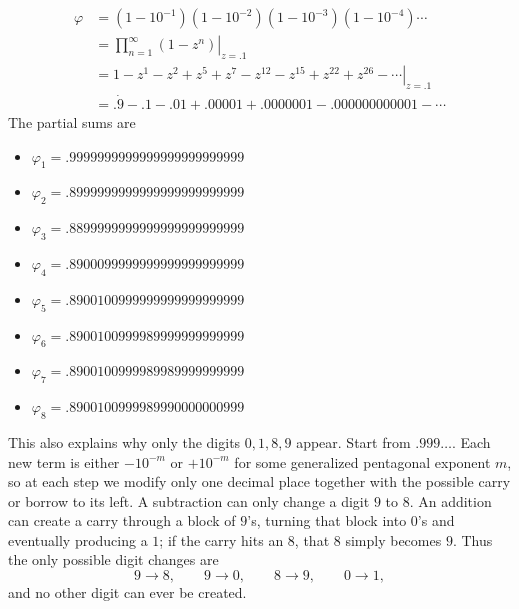 \begin{equation*}
    \begin{aligned}
        \varphi
            &= (1 - 10^{-1})(1 - 10^{-2})(1 - 10^{-3})(1 - 10^{-4}) \cdots \\
            &= \left.\prod_{n = 1}^{\infty}(1 - z^{n})\right|_{z = .1} \\
            &= \left.1 - z^{1} - z^{2} + z^{5} + z^{7} - z^{12} - z^{15} + z^{22} + z^{26} - \cdots \right|_{z = .1} \\
            &= .\dot{9} - .1 - .01 + .00001 + .0000001 - .000000000001 - \cdots
    \end{aligned}
\end{equation*}
The partial sums are
\begin{itemize}
    \item $\varphi_{1} = .99999 99999 99999 99999 99999$
    \item $\varphi_{2} = .89999 99999 99999 99999 99999$
    \item $\varphi_{3} = .88999 99999 99999 99999 99999$
    \item $\varphi_{4} = .89000 99999 99999 99999 99999$
    \item $\varphi_{5} = .89001 00999 99999 99999 99999$
    \item $\varphi_{6} = .89001 00999 98999 99999 99999$
    \item $\varphi_{7} = .89001 00999 98998 99999 99999$
    \item $\varphi_{8} = .89001 00999 98999 00000 00999$
\end{itemize}
This also explains why only the digits $0,1,8,9$ appear. Start from $.999\ldots$.
Each new term is either $-10^{-m}$ or $+10^{-m}$ for some generalized pentagonal
exponent $m$, so at each step we modify only one decimal place together with the
possible carry or borrow to its left. A subtraction can only change a digit $9$ to $8$.
An addition can create a carry through a block of $9$'s, turning that block into $0$'s and
eventually producing a $1$; if the carry hits an $8$, that $8$ simply becomes $9$.
Thus the only possible digit changes are
\[
9 \to 8,\qquad 9 \to 0,\qquad 8 \to 9,\qquad 0 \to 1,
\]
and no other digit can ever be created.


